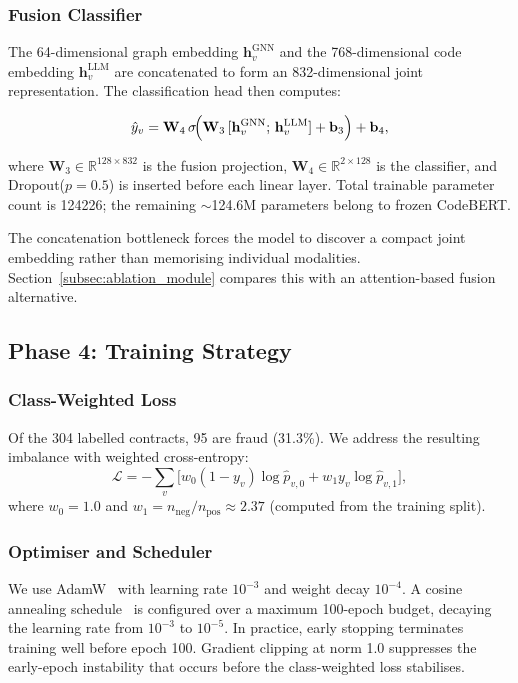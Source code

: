 \subsubsection{Fusion Classifier}
\label{subsubsec:fusion}

The 64-dimensional graph embedding $\mathbf{h}_v^{\text{GNN}}$ and the
768-dimensional code embedding $\mathbf{h}_v^{\text{LLM}}$ are
concatenated to form an 832-dimensional joint representation.  The
classification head then computes:

\begin{equation}
\hat{y}_v = \mathbf{W}_4 \, \sigma\!\Bigl(
  \mathbf{W}_3 \,[\mathbf{h}_v^{\text{GNN}};\, \mathbf{h}_v^{\text{LLM}}] + \mathbf{b}_3
\Bigr) + \mathbf{b}_4,
\label{eq:fusion}
\end{equation}

where $\mathbf{W}_3 \in \mathbb{R}^{128 \times 832}$ is the fusion
projection, $\mathbf{W}_4 \in \mathbb{R}^{2 \times 128}$ is the
classifier, and Dropout($p=0.5$) is inserted before each linear layer.
Total trainable parameter count is \num{124226}; the remaining
$\sim$124.6M parameters belong to frozen CodeBERT.

The concatenation bottleneck forces the model to discover a compact joint
embedding rather than memorising individual modalities.
Section~\ref{subsec:ablation_module} compares this with an
attention-based fusion alternative.

\subsection{Phase 4: Training Strategy}
\label{subsec:training}

\subsubsection{Class-Weighted Loss}
Of the 304 labelled contracts, 95 are fraud (31.3\%).  We address the
resulting imbalance with weighted cross-entropy:
\begin{equation}
\mathcal{L} = -\sum_v \bigl[
  w_0(1-y_v)\log\hat{p}_{v,0} + w_1 y_v \log\hat{p}_{v,1}
\bigr],
\label{eq:loss}
\end{equation}
where $w_0 = 1.0$ and $w_1 = n_{\text{neg}} / n_{\text{pos}} \approx
2.37$ (computed from the training split).

\subsubsection{Optimiser and Scheduler}
We use AdamW~\cite{loshchilov2019adamw} with learning rate $10^{-3}$ and
weight decay $10^{-4}$.  A cosine annealing
schedule~\cite{loshchilov2017cosine} is configured over a maximum
100-epoch budget, decaying the learning rate from $10^{-3}$ to
$10^{-5}$.  In practice, early stopping terminates training well before
epoch 100.  Gradient clipping at norm 1.0 suppresses the early-epoch
instability that occurs before the class-weighted loss stabilises.

